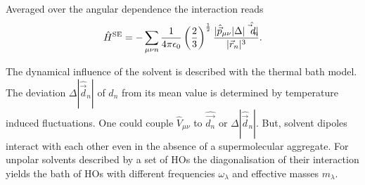 \documentclass[12pt,twoside,a4paper]{report}
\begin{document}
Averaged over the angular dependence the interaction reads \cite{a15}
\begin{eqnarray}
\label{averaged_value_of_interaction}
\hat H
^{\rm SE}      =
                  -  \sum 
                     \limits_{\mu{}\nu n}
                     \frac{1}{4 \pi \epsilon_0}
                     \left(
                         \frac{2}{3}
                     \right)^{\frac{1}{2}}
                     \frac
                          {|\hat {\vec p}_{\mu \nu}|\Delta|\hat{\vec d_n}|}
                          {|\vec r_n|^3}.
\end{eqnarray}


The dynamical influence of the solvent is described with the thermal
bath model.  The deviation 
$\Delta \left| \hat{\vec{d}}_n\right|$ of $d_n$ from its mean value is
determined by temperature induced fluctuations.  
One could couple  $\hat V_{\mu \nu}$ to
$\hat{\vec{d_n}}$
or 
$\Delta \left| \hat{\vec{d}}_n\right|$. 
But, 
solvent dipoles interact with each other
even in the absence of a supermolecular aggregate.
For
unpolar solvents 
described by
a set of HOs
the diagonalisation 
of their interaction 
yields
the  bath of HOs with different frequencies $\omega_\lambda$ 
and effective masses $m_\lambda$.
\end{document}

